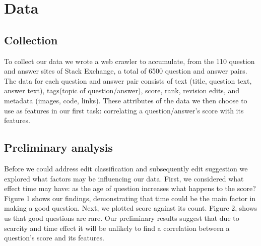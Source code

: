 \documentclass[11pt, oneside]{article}   	%
\begin{document}
\section{Data}
\subsection{Collection}
To collect our data we wrote a web crawler to accumulate, from the 110 question and answer sites of Stack Exchange, a total of 6500 question and answer pairs. The data for each question and answer pair consists of text (title, question text, answer text), tags(topic of question/answer), score, rank, revision edits, and metadata (images, code, links). These attributes of the data we then choose to use as features in our first task: correlating a question/answer's score with its features. 

\subsection{Preliminary analysis}
Before we could address edit classification and subsequently edit suggestion we explored what factors may be influencing our data. First, we considered what effect time may have: as the age of question increases what happens to the score? Figure 1 shows our findings, demonstrating that time could be the main factor in making a good question. Next, we plotted score against its count. Figure 2, shows us that good questions are rare. Our preliminary results suggest that due to scarcity and time effect it will be unlikely to find a correlation between a question's score and its features. 
\\[.5cm]
\end{document}
